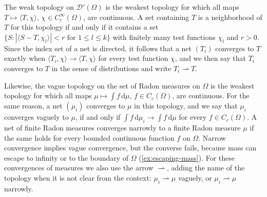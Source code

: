 The weak topology on $\mathcal D'(\Omega)$ is the weakest topology for which all maps $T\mapsto\langle T,\chi\rangle$, $\chi\in C_c^\infty(\Omega)$, are continuous. A set containing $T$ is a neighborhood of $T$ for this topology if and only if it contains a set $\{S:|\langle S-T,\chi_l\rangle|<r\text{ for }1\leq l\leq k\}$ with finitely many test functions $\chi_l$ and $r>0$. Since the index set of a net is directed, it follows that a net $(T_i)$ converges to $T$ exactly when $\langle T_i,\chi\rangle\to\langle T,\chi\rangle$ for every test function $\chi$, and we then say that $T_i$ converges to $T$ in the sense of distributions and write $T_i\rightharpoonup T$.

Likewise, the vague topology on the set of Radon measures on $\Omega$ is the weakest topology for which all maps $\mu\mapsto\int f\,\mathrm d\mu$, $f\in C_c(\Omega)$, are continuous. For the same reason, a net $(\mu_i)$ converges to $\mu$ in this topology, and we say that $\mu_i$ converges vaguely to $\mu$, if and only if $\int f\,\mathrm d\mu_i\to\int f\,\mathrm d\mu$ for every $f\in C_c(\Omega)$. A net of finite Radon measures converges narrowly to a finite Radon measure $\mu$ if the same holds for every bounded continuous function $f$ on $\Omega$. Narrow convergence implies vague convergence, but the converse fails, because mass can escape to infinity or to the boundary of $\Omega$ (\cref{ex:escaping-mass}). For these convergences of measures we also use the arrow $\rightharpoonup$, adding the name of the topology when it is not clear from the context: $\mu_i\rightharpoonup\mu$ vaguely, or $\mu_i\rightharpoonup\mu$ narrowly.

